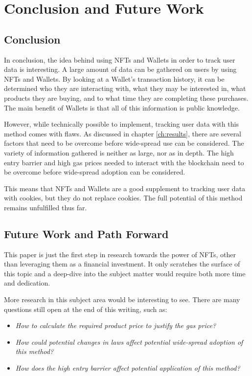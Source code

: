 \chapter{Conclusion and Future Work}
\label{ch:conclusion}

%
%
\section{Conclusion}
\label{sec:conclusion:conclusion}
In conclusion, the idea behind using NFTs and Wallets in order to track user data is interesting. A large amount of data can be gathered on users by using NFTs and Wallets. By looking at a Wallet's transaction history, it can be determined who they are interacting with, what they may be interested in, what products they are buying, and to what time they are completing these purchases. The main benefit of Wallets is that all of this information is public knowledge.

However, while technically possible to implement, tracking user data with this method comes with flaws. As discussed in chapter \ref{ch:results}, there are several factors that need to be overcome before wide-spread use can be considered. The variety of information gathered is neither as large, nor as in depth. The high entry barrier and high gas prices needed to interact with the blockchain need to be overcome before wide-spread adoption can be considered.

This means that NFTs and Wallets are a good supplement to tracking user data with cookies, but they do not replace cookies. The full potential of this method remains unfulfilled thus far.



%
%
\section{Future Work and Path Forward}
\label{sec:conclusion:futureWork}
This paper is just the first step in research towards the power of NFTs, other than leveraging them as a financial investment. It only scratches the surface of this topic and a deep-dive into the subject matter would require both more time and dedication.

More research in this subject area would be interesting to see. There are many questions still open at the end of this writing, such as:
\begin{itemize}
	\item \textit{How to calculate the required product price to justify the gas price?}
	\item \textit{How could potential changes in laws affect potential wide-spread adoption of this method?}
	\item \textit{How does the high entry barrier affect potential application of this method?}
\end{itemize}

